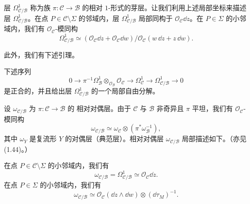 层 $\Omega^1_{\mathcal{C}/\mathcal{B}}$ 称为族 $\pi:\mathcal{C}\to\mathcal{B}$
的相对 $1$-形式的芽层。让我们利用上述局部坐标来描述层
$\Omega^1_{\mathcal{C}/\mathcal{B}}$。在点 $P\in\mathcal{C}\setminus\Sigma$
的邻域内，层 $\Omega^1_{\mathcal{C}/\mathcal{B}}$ 局部同构于
$\mathcal{O}_{\mathcal{C}}\dd z$。在 $P\in\Sigma$ 的小邻域内，我们有
$\mathcal{O}_{\mathcal{C}}$-模同构
\begin{equation}
\Omega^1_{\mathcal{C}/\mathcal{B}}\simeq
(\mathcal{O}_{\mathcal{C}}\dd z+\mathcal{O}_{\mathcal{C}}\dd w)
\big/\mathcal{O}_{\mathcal{C}}(w\,\dd z+z\,\dd w). \tag{1.57}
\end{equation}

此外，我们有下述引理。

\begin{lemma}[1.31]
下述序列
\begin{equation}
0\to\pi^{-1}\Omega^1_{\mathcal{B}}\otimes_{\mathcal{O}_{\mathcal{B}}}
\mathcal{O}_{\mathcal{C}}\to\Omega^1_{\mathcal{C}}\to
\Omega^1_{\mathcal{C}/\mathcal{B}}\to 0 \tag{1.58}
\end{equation}
是正合的，并且给出层 $\Omega^1_{\mathcal{C}/\mathcal{B}}$ 的一个局部自由分解。
\end{lemma}

设 $\omega_{\mathcal{C}/\mathcal{B}}$ 为 $\pi:\mathcal{C}\to\mathcal{B}$ 的
相对对偶层。由于 $\mathcal{C}$ 与 $\mathcal{B}$ 非奇异且 $\pi$ 平坦，我们有
$\mathcal{O}_{\mathcal{C}}$-模同构
\[
\omega_{\mathcal{C}/\mathcal{B}}\simeq
\omega_{\mathcal{C}}\otimes(\pi^*\omega_{\mathcal{B}}^{-1}),
\]
其中 $\omega_Y$ 是复流形 $Y$ 的对偶层（典范层）。相对对偶层
$\omega_{\mathcal{C}/\mathcal{B}}$ 局部描述如下。（亦见 (1.44)。）

在点 $P\in\mathcal{C}\setminus\Sigma$ 的小邻域内，我们有
\[
\omega_{\mathcal{C}/\mathcal{B}}=
\Omega^1_{\mathcal{C}/\mathcal{B}}\simeq\mathcal{O}_{\mathcal{C}}\dd z.
\]
在点 $P\in\Sigma$ 的小邻域内，我们有
\[
\omega_{\mathcal{C}/\mathcal{B}}\simeq
\mathcal{O}_{\mathcal{C}}(\dd z\wedge\dd w)\otimes(\dd\tau_M)^{-1}.
\]

